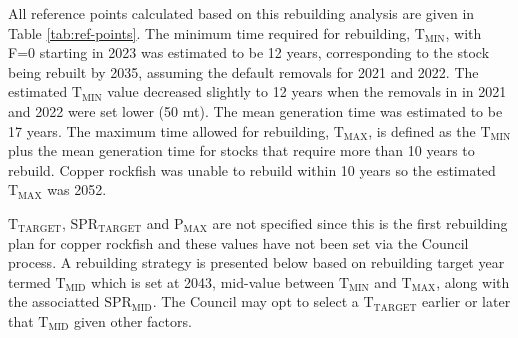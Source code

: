 \documentclass[11pt,
  english,
  a4paper,
]{article}
\begin{document}
All reference points calculated based on this rebuilding analysis are given in Table \ref{tab:ref-points}. The minimum time required for rebuilding, {\(\text{T}_\text{MIN}\)\leavevmode\tagmcend\tagstructend}, with F=0 starting in 2023 was estimated to be 12 years, corresponding to the stock being rebuilt by 2035, assuming the default removals for 2021 and 2022. The estimated {\(\text{T}_\text{MIN}\)\leavevmode\tagmcend\tagstructend} value decreased slightly to 12 years when the removals in in 2021 and 2022 were set lower (50 mt). The mean generation time was estimated to be 17 years. The maximum time allowed for rebuilding, {\(\text{T}_\text{MAX}\)\leavevmode\tagmcend\tagstructend}, is defined as the {\(\text{T}_\text{MIN}\)\leavevmode\tagmcend\tagstructend} plus the mean generation time for stocks that require more than 10 years to rebuild. Copper rockfish was unable to rebuild within 10 years so the estimated {\(\text{T}_\text{MAX}\)\leavevmode\tagmcend\tagstructend} was 2052.

\leavevmode\tagmcend\tagstructend\par


{\(\text{T}_\text{TARGET}\)\leavevmode\tagmcend\tagstructend}, {\(\text{SPR}_\text{TARGET}\)\leavevmode\tagmcend\tagstructend} and {\(\text{P}_\text{MAX}\)\leavevmode\tagmcend\tagstructend} are not specified since this is the first rebuilding plan for copper rockfish and these values have not been set via the Council process. A rebuilding strategy is presented below based on rebuilding target year termed {\(\text{T}_\text{MID}\)\leavevmode\tagmcend\tagstructend} which is set at 2043, mid-value between {\(\text{T}_\text{MIN}\)\leavevmode\tagmcend\tagstructend} and {\(\text{T}_\text{MAX}\)\leavevmode\tagmcend\tagstructend}, along with the associatted {\(\text{SPR}_\text{MID}\)\leavevmode\tagmcend\tagstructend}. The Council may opt to select a {\(\text{T}_\text{TARGET}\)\leavevmode\tagmcend\tagstructend} earlier or later that {\(\text{T}_\text{MID}\)\leavevmode\tagmcend\tagstructend} given other factors.
\end{document}
